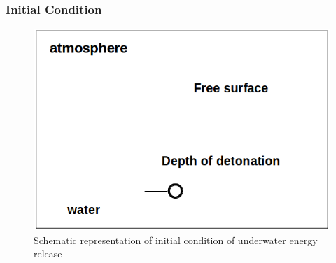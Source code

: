 \documentclass{beamer}
\begin{document}

\begin{frame}
\frametitle{Initial Condition}
\begin{figure}[h]  
\begin{center}  
\includegraphics[scale=0.4]{1.png}
\caption{\tiny{Schematic representation of initial condition of underwater energy release}}
\end{center}  
\end{figure}
\end{frame}

\end{document}
